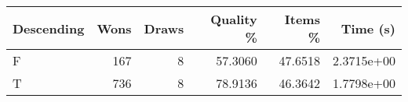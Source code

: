 \begin{tabular}{lrrrrr}
    \hline
    Descending & Wons & Draws & Quality \% & Items \% & Time (s)   \\
    \hline
    F          & 167  & 8     & 57.3060    & 47.6518  & 2.3715e+00 \\
    T          & 736  & 8     & 78.9136    & 46.3642  & 1.7798e+00 \\
    \hline
\end{tabular}
